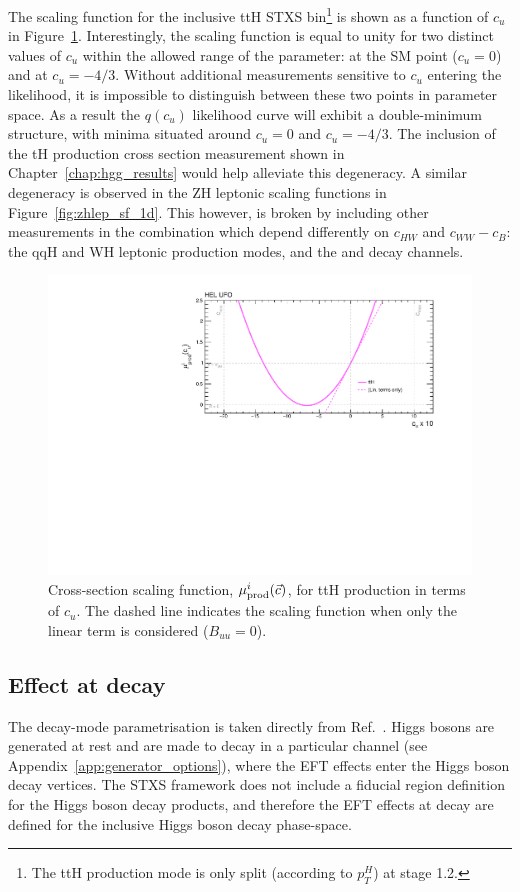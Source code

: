 The scaling function for the inclusive ttH STXS bin\footnote{The ttH production mode is only split (according to $p_T^H$) at stage 1.2.} is shown as a function of $c_u$ in Figure~\ref{fig:tth_sf_1d}. Interestingly, the scaling function is equal to unity for two distinct values of $c_u$ within the allowed range of the parameter: at the SM point ($c_u=0$) and at $c_u=-4/3$. Without additional measurements sensitive to $c_u$ entering the likelihood, it is impossible to distinguish between these two points in parameter space. As a result the $q(c_u)$ likelihood curve will exhibit a double-minimum structure, with minima situated around $c_u=0$ and $c_u=-4/3$. The inclusion of the tH production cross section measurement shown in Chapter~\ref{chap:hgg_results} would help alleviate this degeneracy. A similar degeneracy is observed in the ZH leptonic scaling functions in Figure~\ref{fig:zhlep_sf_1d}. This however, is broken by including other measurements in the combination which depend differently on $c_{HW}$ and $c_{WW}-c_B$: the qqH and WH leptonic production modes, and the \HZZ and \HWW decay channels.

\begin{figure}
  \centering
  \includegraphics[width=.7\textwidth]{Figures/eft/scaling_functions/ttH_vs_cu.pdf}
  \caption[HEL cross-section scaling function for ttH STXS bin]
  {
    Cross-section scaling function, $\mu_{\rm{prod}}^i(\vec{c})$, for ttH production in terms of $c_{u}$. The dashed line indicates the scaling function when only the linear term is considered ($B_{uu}=0$).
  }
  \label{fig:tth_sf_1d}
\end{figure}


\subsection{Effect at decay}
The decay-mode parametrisation is taken directly from Ref.~\cite{Hays:2673969}. Higgs bosons are generated at rest and are made to decay in a particular channel (see Appendix~\ref{app:generator_options}), where the EFT effects enter the Higgs boson decay vertices. The STXS framework does not include a fiducial region definition for the Higgs boson decay products, and therefore the EFT effects at decay are defined for the inclusive Higgs boson decay phase-space. 


